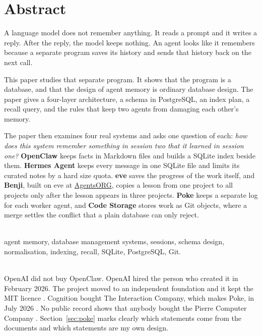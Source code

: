 \documentclass[11pt,a4paper]{article}
\newcommand{\aorg}{\href{https://agents.org.in}{AgentsORG}}
\newcommand{\eyebrow}[1]{{\sffamily\footnotesize\bfseries\color{clay700}%
  \MakeUppercase{\textls[140]{#1}}}}
\begin{document}
\setcounter{page}{2}

\section*{\sffamily\color{blue800}Abstract}

A language model does not remember anything. It reads a prompt and it
writes a reply. After the reply, the model keeps nothing. An agent looks
like it remembers because a separate program saves its history and sends
that history back on the next call.

This paper studies that separate program. It shows that the program is a
database, and that the design of agent memory is ordinary database
design. The paper gives a four-layer architecture, a schema in
PostgreSQL, an index plan, a recall query, and the rules that keep two
agents from damaging each other's memory.

The paper then examines four real systems and asks one question of each:
\emph{how does this system remember something in session two that it
learned in session one?} \textbf{OpenClaw} keeps facts in Markdown files
and builds a SQLite index beside them. \textbf{Hermes Agent} keeps every
message in one SQLite file and limits its curated notes by a hard size
quota. \textbf{eve} saves the progress of the work itself, and
\textbf{Benji}, built on eve at \aorg, copies a lesson from one project
to all projects only after the lesson appears in three projects.
\textbf{Poke} keeps a separate log for each worker agent, and
\textbf{Code Storage} stores work as Git objects, where a merge settles
the conflict that a plain database can only reject.

\vspace{0.4\baselineskip}
\eyebrow{Keywords}\\[2pt]
agent memory, database management systems, sessions, schema design,
normalisation, indexing, recall, SQLite, PostgreSQL, Git.

\vspace{0.7\baselineskip}
{\setlength{\fboxsep}{9pt}%
\colorbox{clay100}{\parbox{\dimexpr\textwidth-18pt\relax}{\small
\eyebrow{A correction to two common claims}\\[3pt]
OpenAI did not buy OpenClaw. OpenAI hired the person who created it in
February 2026. The project moved to an independent foundation and it
kept the MIT licence \cite{tcOpenClaw,forbesOpenClaw}. Cognition bought
The Interaction Company, which makes Poke, in July 2026 \cite{tcPoke}.
No public record shows that anybody bought the Pierre Computer Company
\cite{pierreCo}. Section~\ref{sec:poke} marks clearly which statements
come from the documents and which statements are my own design.}}}
\end{document}
